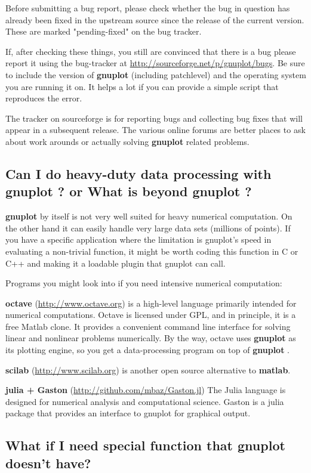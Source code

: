 \documentclass[letter,11pt]{article}
\def\http#1{{\small\href{http://#1}{\url{http://#1}}}}
\newcommand{\http}[1]%
            {\htmladdnormallink{\latex{\url{http://#1}}%
                    \html{\textit{http://#1}}}%
                {http://#1}%
            }
\newcommand{\gnuplot}{\textbf{gnuplot }}
\begin{document}
{Before submitting a bug report, please check whether the bug in question
has already been fixed in the upstream source since the release of the
current version. These are marked "pending-fixed" on the bug tracker.

If, after checking these things, you still are convinced that there is a
bug please report it using the bug-tracker at
\http{sourceforge.net/p/gnuplot/bugs}.
Be sure to include the version of \gnuplot (including patchlevel) and
the operating system you are running it on.
It helps a lot if you can provide a simple script that reproduces the error.

The tracker on sourceforge is for reporting bugs and collecting bug fixes
that will appear in a subsequent release.
The various online forums are better places to ask about
work arounds or actually solving \gnuplot related problems.

\subsection{Can I do heavy-duty data processing with \gnuplot? or
What is beyond \gnuplot?}

\gnuplot by itself is not very well suited for heavy numerical computation.
On the other hand it can easily handle very large data sets (millions of points).
If you have a specific application where the limitation is gnuplot's speed in
evaluating a non-trivial function, it might be worth coding this function in
C or C++ and making it a loadable plugin that gnuplot can call.

Programs you might look into if you need intensive numerical computation:

\textbf{octave} (\http{www.octave.org})
is a high-level language primarily intended for numerical computations.
Octave is licensed under GPL, and in principle, it is a free Matlab clone.
It provides a convenient command line interface for solving linear and nonlinear problems
numerically.  By the way, octave uses \gnuplot as its plotting
engine, so you get a data-processing program on top of \gnuplot.

\textbf{scilab} (\http{www.scilab.org}) is another open source alternative to \textbf{matlab}.

\textbf{julia + Gaston} (\http{github.com/mbaz/Gaston.jl})
The Julia language is designed for numerical analysis and computational science.
Gaston is a julia package that provides an interface to gnuplot for graphical output.

\subsection{What if I need special function that gnuplot doesn't have?}

}
\end{document}
